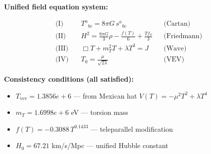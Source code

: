 
\textbf{Unified field equation system:}

\begin{align}
  \text{(I)} \quad & T^a{}_{bc} = 8\pi G \, s^a{}_{bc} && \text{(Cartan)} \\
  \text{(II)} \quad & H^2 = \frac{8\pi G}{3}\rho - \frac{f(T)}{6} + \frac{Tf_T}{3} && \text{(Friedmann)} \\
  \text{(III)} \quad & \Box T + m_T^2 T + \lambda T^3 = J && \text{(Wave)} \\
  \text{(IV)} \quad & T_0 = \frac{\mu}{\sqrt{2\lambda}} && \text{(VEV)}
\end{align}

\textbf{Consistency conditions (all satisfied):}
\begin{itemize}
  \item $T_{\text{vev}} = 1.3856e+6$ — from Mexican hat $V(T) = -\mu^2 T^2 + \lambda T^4$
  \item $m_T = 1.6998e+6$ eV — torsion mass
  \item $f(T) = -0.3088 \, T^{0.1433}$ — teleparallel modification
  \item $H_0 = 67.21$ km/s/Mpc — unified Hubble constant
\end{itemize}